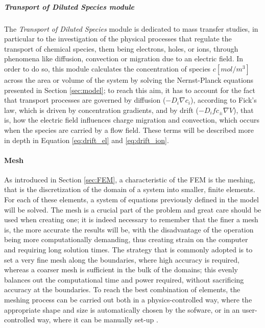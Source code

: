 \subparagraph{Transport of Diluted Species module}
The \emph{Transport of Diluted Species} module is dedicated to mass transfer
studies, in particular to the investigation of the physical processes that
regulate the transport of chemical species, them being electrons, holes, or
ions, through phenomena like diffusion, convection or migration due to an
electric field. In order to do so, this module calculates the concentration of
species $c \left[mol/m^3\right]$ across the area or volume of the system by
solving the Nernst-Planck equations presented in Section \ref{sec:model}; to
reach this aim, it has to account for the fact that transport processes are
governed by diffusion ($-D_i \nabla c_i$), according to Fick's law, which is
driven by concentration gradients, and by drift ($-D_ifc_{\pm}\nabla V$), that
is, how the electric field influences charge migration and convection, which
occurs when the species are carried by a flow field. These terms will be
described more in depth in Equation \eqref{eq:drift_el} and
\eqref{eq:drift_ion}.

\paragraph{Mesh}
As introduced in Section \ref{sec:FEM}, a characteristic of the FEM is the
meshing, that is the discretization of the domain of a system into smaller,
finite elements. For each of these elements, a system of equations previously
defined in the model will be solved. The mesh is a crucial part of the problem
and great care should be used when creating one; it is indeed necessary to
remember that the finer a mesh is, the more accurate the results will be, with
the disadvantage of the operation being more computationally demanding, thus
creating strain on the computer and requiring long solution times. The strategy
that is commonly adopted is to set a very fine mesh along the boundaries, where
high accuracy is required, whereas a coarser mesh is sufficient in the bulk of
the domains; this evenly balances out the computational time and power required,
without sacrificing accuracy at the boundaries. To reach the best combination of
elements, the meshing process can be carried out both in a physics-controlled
way, where the appropriate shape and size is automatically chosen by the
sofware, or in an user-controlled way, where it can be manually set-up
\citep{comsolCOMSOL_manual}.

